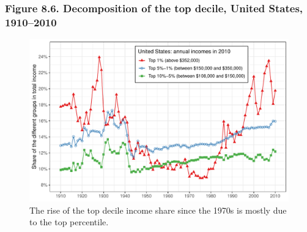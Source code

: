 \documentclass[t]{beamer}\usepackage[]{graphicx}\usepackage[]{color}
\newenvironment{knitrout}{}{} %
\begin{document}
\begin{frame}[label=Figure_8_6,fragile]
\frametitle{Figure 8.6. Decomposition of the top decile, United States, 1910--2010}
\begin{figure}[t]
\begin{minipage}[b]{\textwidth}
\centering
\begin{knitrout}\footnotesize
{}\color{fgcolor}

{\centering \includegraphics[width=1\linewidth]{figures/color/Figure_8_6} 

}



\end{knitrout}
\caption{The rise of the top decile income share since the 1970s is mostly due to the top percentile.}
\end{minipage}
\end{figure}
\end{frame}
\end{document}
